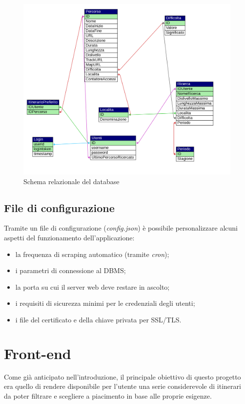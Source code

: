\documentclass[11pt]{report}
\begin{document}
\begin{figure}
	\centering
	\includegraphics[scale=0.45]{DB_schema}
	\caption{Schema relazionale del database \label{db_schema}}
\end{figure}
\subsection{File di configurazione}
Tramite un file di configurazione (\textit{config.json}) è possibile personalizzare alcuni aspetti del funzionamento dell'applicazione:
\begin{itemize}
	\item la frequenza di scraping automatico (tramite \textit{cron});
	\item i parametri di connessione al DBMS;
	\item la porta su cui il server web deve restare in ascolto;
	\item i requisiti di sicurezza minimi per le credenziali degli utenti;
	\item i file del certificato e della chiave privata per SSL/TLS.
\end{itemize}
\pagebreak
\section{Front-end}
Come già anticipato nell'introduzione, il principale obiettivo di questo progetto era quello di rendere disponibile per l'utente una serie considerevole di itinerari da poter filtrare e scegliere a piacimento in base alle proprie esigenze.
\end{document}
